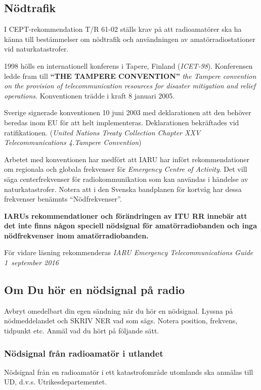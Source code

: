 \subsection{Nödtrafik}

I CEPT-rekommendation T/R 61-02 ställs krav på att radioamatörer ska ha känna
till bestämmelser om nödtrafik och användningen av amatörradiostationer vid
naturkatastrofer.

1998 hölls en internationell konferens i Tapere, Finland (\emph{ICET-98}).
Konferensen ledde fram till \textbf{``THE TAMPERE CONVENTION''} \emph{the
	Tampere convention on the provision of telecommunication resources for disaster
	mitigation and relief operations}. Konventionen trädde i kraft 8 januari 2005.

Sverige signerade konventionen 10 juni 2003 med deklarationen att den behöver
beredas inom EU för att helt implementeras. Deklarationen bekräftades vid
ratifikationen. (\emph{United Nations Treaty Collection Chapter XXV Telecommunications 4.Tampere Convention})

Arbetet med konventionen har medfört att IARU har infört rekommendationer om
regionala och globala frekvenser för \emph{Emergency Centre of Activity}. Det
vill säga centerfrekvenser för radiokommunikation som kan användas i händelse
av naturkatastrofer. Notera att i den Svenska bandplanen för kortvåg har dessa
frekvenser benämnts ``Nödfrekvenser''.

\textbf{IARUs rekommendationer och förändringen av ITU RR innebär att det inte
	finns någon speciell nödsignal för amatörradiobanden och inga nödfrekvenser
	inom amatörradiobanden.}   

För vidare läsning rekommenderas
\emph{IARU Emergency Telecommunications Guide 1~september 2016}

\subsection{Om Du hör en nödsignal på radio}

Avbryt omedelbart din egen sändning när du hör en nödsignal. Lyssna på
nödmeddelandet och SKRIV NER vad som sägs. Notera position, frekvens, tidpunkt
etc. Anmäl vad du hört på följande sätt.

\subsubsection{Nödsignal från radioamatör i utlandet}

Nödsignal från en radioamatör i ett katastrofområde utomlands ska anmälas till UD, d.v.s.
Utrikesdepartementet.

